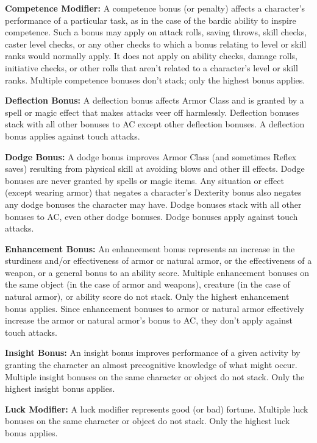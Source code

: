 \textbf{Competence Modifier:} A competence bonus (or penalty) affects a character's performance of a particular task, as in the case of the bardic ability to inspire competence. Such a bonus may apply on attack rolls, saving throws, skill checks, caster level checks, or any other checks to which a bonus relating to level or skill ranks would normally apply. It does not apply on ability checks, damage rolls, initiative checks, or other rolls that aren't related to a character's level or skill ranks. Multiple competence bonuses don't stack; only the highest bonus applies.

\textbf{Deflection Bonus:} A deflection bonus affects Armor Class and is granted by a spell or magic effect that makes attacks veer off harmlessly. Deflection bonuses stack with all other bonuses to AC except other deflection bonuses. A deflection bonus applies against touch attacks.

\textbf{Dodge Bonus:} A dodge bonus improves Armor Class (and sometimes Reflex saves) resulting from physical skill at avoiding blows and other ill effects. Dodge bonuses are never granted by spells or magic items. Any situation or effect (except wearing armor) that negates a character's Dexterity bonus also negates any dodge bonuses the character may have. Dodge bonuses stack with all other bonuses to AC, even other dodge bonuses. Dodge bonuses apply against touch attacks.

\textbf{Enhancement Bonus:} An enhancement bonus represents an increase in the sturdiness and/or effectiveness of armor or natural armor, or the effectiveness of a weapon, or a general bonus to an ability score. Multiple enhancement bonuses on the same object (in the case of armor and weapons), creature (in the case of natural armor), or ability score do not stack. Only the highest enhancement bonus applies. Since enhancement bonuses to armor or natural armor effectively increase the armor or natural armor's bonus to AC, they don't apply against touch attacks.

\textbf{Insight Bonus:} An insight bonus improves performance of a given activity by granting the character an almost precognitive knowledge of what might occur. Multiple insight bonuses on the same character or object do not stack. Only the highest insight bonus applies.

\textbf{Luck Modifier:} A luck modifier represents good (or bad) fortune. Multiple luck bonuses on the same character or object do not stack. Only the highest luck bonus applies.

